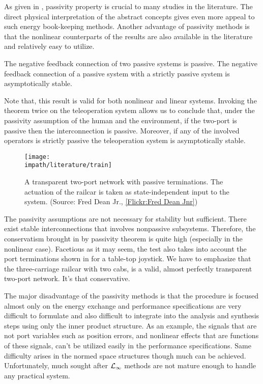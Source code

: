 As given in , passivity property is crucial to many studies in the literature. The direct physical interpretation
of the abstract concepts gives even more appeal to such energy book-keeping methods. Another advantage of passivity methods is that 
the nonlinear counterparts of the results are also available in the literature and relatively easy to utilize. 

\begin{thm} The negative feedback connection of two passive systems is passive. The negative feedback connection of a passive system with
a strictly passive system is asymptotically stable.\end{thm}

Note that, this result is valid for both nonlinear and linear systems. Invoking the theorem twice on the teleoperation system allows us to conclude that,
under the passivity assumption of the human and the environment, if the two-port is  passive then the interconnection is passive. Moreover, if any of 
the involved operators is strictly passive the teleoperation system is asymptotically stable. 

\begin{figure}%
\centering
\texttt{[image: \\impath/literature/train]}%
\caption[A transparent two-port network with passive terminations]{A transparent two-port network with passive 
terminations. The actuation of the railcar is taken as state-independent input to the system. (Source: Fred Dean Jr., 
\href{http://www.flickr.com/photos/be216cd1/5971825854/}{[Flickr:Fred Dean Jnr]})}%
\label{fig:lit:train}%
\end{figure}


The passivity assumptions are not necessary for stability but sufficient. There exist stable interconnections that involves nonpassive 
subsystems. Therefore, the conservatism brought in by passivity theorem is quite high (especially in the nonlinear case). Facetious as it 
may seem, the test also takes into account the port terminations shown in  for a table-top joystick. We have to emphasize that
the three-carriage railcar with two cabs, is a valid, almost perfectly transparent two-port network. It's that conservative.


The major disadvantage of the passivity methods is that the procedure is focused almost only on the 
energy exchange and performance specifications are very difficult to formulate and also difficult to integrate 
into the analysis and synthesis steps using only the inner product structure. As an example, the signals that are not port variables such as position errors,
and nonlinear effects that are functions of these signals, can't be utilized easily in the performance specifications. 
Same difficulty arises in the normed space structures though much can be achieved. Unfortunately, much sought after $\mathcal{L}_\infty$ methods are not mature enough to handle any practical system. 


